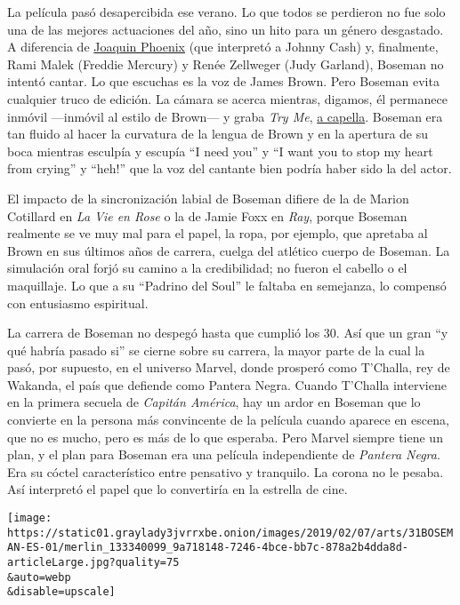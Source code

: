 La película pasó desapercibida ese verano. Lo que todos se perdieron no
fue solo una de las mejores actuaciones del año, sino un hito para un
género desgastado. A diferencia de
\href{https://www.nytimes3xbfgragh.onion/2005/11/18/movies/the-man-in-black-on-stage-and-off.html}{Joaquin
Phoenix} (que interpretó a Johnny Cash) y, finalmente, Rami Malek
(Freddie Mercury) y Renée Zellweger (Judy Garland), Boseman no intentó
cantar. Lo que escuchas es la voz de James Brown. Pero Boseman evita
cualquier truco de edición. La cámara se acerca mientras, digamos, él
permanece inmóvil ---inmóvil al estilo de Brown--- y graba \emph{Try
Me}, \href{https://www.youtube.com/watch?v=_OIcuozqEjo}{a capella}.
Boseman era tan fluido al hacer la curvatura de la lengua de Brown y en
la apertura de su boca mientras esculpía y escupía ``I need you'' y ``I
want you to stop my heart from crying'' y ``heh!'' que la voz del
cantante bien podría haber sido la del actor.

El impacto de la sincronización labial de Boseman difiere de la de
Marion Cotillard en \emph{La Vie en Rose} o la de Jamie Foxx en
\emph{Ray}, porque Boseman realmente se ve muy mal para el papel, la
ropa, por ejemplo, que apretaba al Brown en sus últimos años de carrera,
cuelga del atlético cuerpo de Boseman. La simulación oral forjó su
camino a la credibilidad; no fueron el cabello o el maquillaje. Lo que a
su ``Padrino del Soul'' le faltaba en semejanza, lo compensó con
entusiasmo espiritual.

La carrera de Boseman no despegó hasta que cumplió los 30. Así que un
gran ``y qué habría pasado si'' se cierne sobre su carrera, la mayor
parte de la cual la pasó, por supuesto, en el universo Marvel, donde
prosperó como T'Challa, rey de Wakanda, el país que defiende como
Pantera Negra. Cuando T'Challa interviene en la primera secuela de
\emph{Capitán América}, hay un ardor en Boseman que lo convierte en la
persona más convincente de la película cuando aparece en escena, que no
es mucho, pero es más de lo que esperaba. Pero Marvel siempre tiene un
plan, y el plan para Boseman era una película independiente de
\emph{Pantera Negra}. Era su cóctel característico entre pensativo y
tranquilo. La corona no le pesaba. Así interpretó el papel que lo
convertiría en la estrella de cine.

\texttt{[image: https://static01.graylady3jvrrxbe.onion/images/2019/02/07/arts/31BOSEMAN-ES-01/merlin\_133340099\_9a718148-7246-4bce-bb7c-878a2b4dda8d-articleLarge.jpg?quality=75\\\&auto=webp\\\&disable=upscale]}

